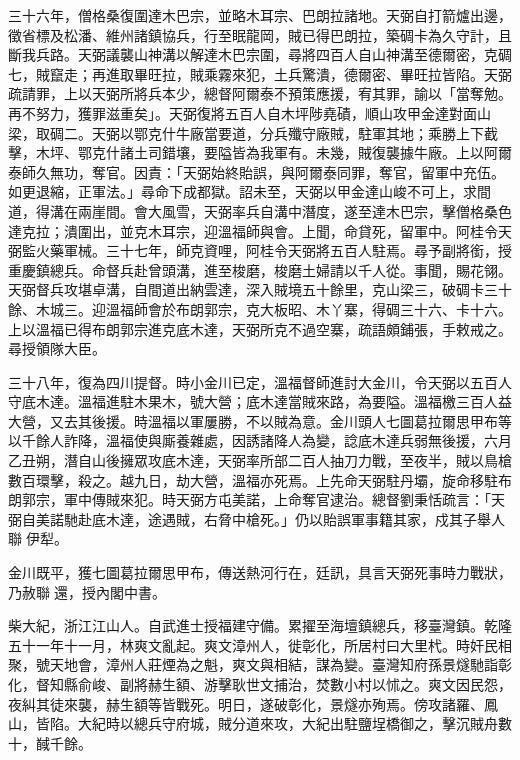 \begin{pinyinscope}
三十六年，僧格桑復圍達木巴宗，並略木耳宗、巴朗拉諸地。天弼自打箭爐出邊，徵省標及松潘、維州諸鎮協兵，行至眠龍岡，賊已得巴朗拉，築碉卡為久守計，且斷我兵路。天弼議襲山神溝以解達木巴宗圍，尋將四百人自山神溝至德爾密，克碉七，賊竄走；再進取畢旺拉，賊乘霧來犯，土兵驚潰，德爾密、畢旺拉皆陷。天弼疏請罪，上以天弼所將兵本少，總督阿爾泰不預策應援，宥其罪，諭以「當奪勉。再不努力，獲罪滋重矣」。天弼復將五百人自木坪陟堯磧，順山攻甲金達對面山梁，取碉二。天弼以鄂克什牛廠當要道，分兵殲守廠賊，駐軍其地；乘勝上下截擊，木坪、鄂克什諸土司錯壤，要隘皆為我軍有。未幾，賊復襲據牛廠。上以阿爾泰師久無功，奪官。因責：「天弼始終貽誤，與阿爾泰同罪，奪官，留軍中充伍。如更退縮，正軍法。」尋命下成都獄。詔未至，天弼以甲金達山峻不可上，求間道，得溝在兩崖間。會大風雪，天弼率兵自溝中潛度，遂至達木巴宗，擊僧格桑色達克拉；潰圍出，並克木耳宗，迎溫福師與會。上聞，命貸死，留軍中。阿桂令天弼監火藥軍械。三十七年，師克資哩，阿桂令天弼將五百人駐焉。尋予副將銜，授重慶鎮總兵。命督兵赴曾頭溝，進至梭磨，梭磨土婦請以千人從。事聞，賜花翎。天弼督兵攻堪卓溝，自間道出納雲達，深入賊境五十餘里，克山梁三，破碉卡三十餘、木城三。迎溫福師會於布朗郭宗，克大板昭、木丫寨，得碉三十六、卡十六。上以溫福已得布朗郭宗進克底木達，天弼所克不過空寨，疏語頗鋪張，手敕戒之。尋授領隊大臣。

三十八年，復為四川提督。時小金川已定，溫福督師進討大金川，令天弼以五百人守底木達。溫福進駐木果木，號大營；底木達當賊來路，為要隘。溫福檄三百人益大營，又去其後援。時溫福以軍屢勝，不以賊為意。金川頭人七圖葛拉爾思甲布等以千餘人詐降，溫福使與廝養雜處，因誘諸降人為變，諗底木達兵弱無後援，六月乙丑朔，潛自山後擁眾攻底木達，天弼率所部二百人抽刀力戰，至夜半，賊以鳥槍數百環擊，殺之。越九日，劫大營，溫福亦死焉。上先命天弼駐丹壩，旋命移駐布朗郭宗，軍中傳賊來犯。時天弼方屯美諾，上命奪官逮治。總督劉秉恬疏言：「天弼自美諾馳赴底木達，途遇賊，右脅中槍死。」仍以貽誤軍事籍其家，戍其子舉人聯伊犁。

金川既平，獲七圖葛拉爾思甲布，傳送熱河行在，廷訊，具言天弼死事時力戰狀，乃赦聯還，授內閣中書。

柴大紀，浙江江山人。自武進士授福建守備。累擢至海壇鎮總兵，移臺灣鎮。乾隆五十一年十一月，林爽文亂起。爽文漳州人，徙彰化，所居村曰大里杙。時奸民相聚，號天地會，漳州人莊煙為之魁，爽文與相結，謀為變。臺灣知府孫景燧馳詣彰化，督知縣俞峻、副將赫生額、游擊耿世文捕治，焚數小村以怵之。爽文因民怨，夜糾其徒來襲，赫生額等皆戰死。明日，遂破彰化，景燧亦殉焉。傍攻諸羅、鳳山，皆陷。大紀時以總兵守府城，賊分道來攻，大紀出駐鹽埕橋御之，擊沉賊舟數十，馘千餘。


\end{pinyinscope}
